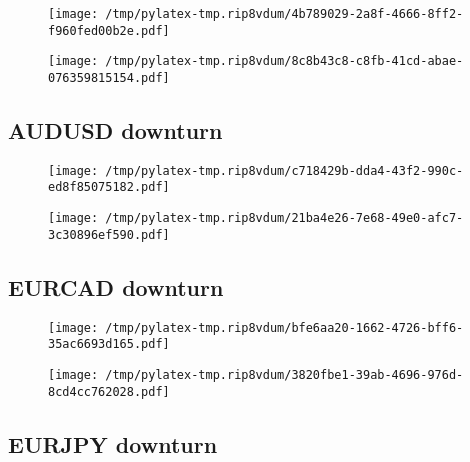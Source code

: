 \documentclass{article}%
\begin{document}
\begin{figure}[htbp]%
\centering%
\texttt{[image: /tmp/pylatex-tmp.rip8vdum/4b789029-2a8f-4666-8ff2-f960fed00b2e.pdf]}%
\end{figure}

%


\begin{figure}[htbp]%
\centering%
\texttt{[image: /tmp/pylatex-tmp.rip8vdum/8c8b43c8-c8fb-41cd-abae-076359815154.pdf]}%
\end{figure}

%
\newpage %
\subsection{AUDUSD downturn}%
\label{subsec:AUDUSDdownturn}%


\begin{figure}[htbp]%
\centering%
\texttt{[image: /tmp/pylatex-tmp.rip8vdum/c718429b-dda4-43f2-990c-ed8f85075182.pdf]}%
\end{figure}

%


\begin{figure}[htbp]%
\centering%
\texttt{[image: /tmp/pylatex-tmp.rip8vdum/21ba4e26-7e68-49e0-afc7-3c30896ef590.pdf]}%
\end{figure}

%
\newpage %
\subsection{EURCAD downturn}%
\label{subsec:EURCADdownturn}%


\begin{figure}[htbp]%
\centering%
\texttt{[image: /tmp/pylatex-tmp.rip8vdum/bfe6aa20-1662-4726-bff6-35ac6693d165.pdf]}%
\end{figure}

%


\begin{figure}[htbp]%
\centering%
\texttt{[image: /tmp/pylatex-tmp.rip8vdum/3820fbe1-39ab-4696-976d-8cd4cc762028.pdf]}%
\end{figure}

%
\newpage %
\subsection{EURJPY downturn}%
\label{subsec:EURJPYdownturn}%
\end{document}
